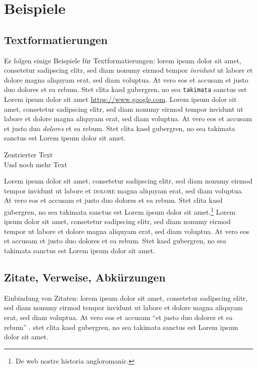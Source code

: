 \chapter{Beispiele}\label{ch:beispiele}
\lipsum[1]

\section{Textformatierungen}\label{sec:textformatierungen}

Es folgen einige Beispiele für Textformatierungen: lorem ipsum dolor sit amet, consetetur sadipscing elitr, sed diam nonumy eirmod tempor \emph{invidunt} ut labore et dolore magna aliquyam erat, sed diam voluptua. At vero eos et accusam et justo duo dolores et ea rebum. Stet clita kasd gubergren, no sea \texttt{takimata} sanctus est Lorem ipsum dolor sit amet \url{https://www.google.com}. Lorem ipsum dolor sit amet, consetetur sadipscing elitr, sed diam nonumy eirmod tempor invidunt ut labore et dolore magna aliquyam erat, sed diam voluptua. At vero eos et accusam et justo duo \textit{dolores} et ea rebum. Stet clita kasd gubergren, no sea takimata sanctus est Lorem ipsum dolor sit amet.

\begin{center}
Zentrierter Text \\
Und noch mehr Text \\
\end{center}

Lorem ipsum dolor sit amet, consetetur sadipscing elitr, sed diam nonumy eirmod tempor invidunt ut labore et \textsc{dolore} magna aliquyam erat, sed diam voluptua. At vero eos et accusam et justo duo dolores et ea rebum. Stet clita kasd gubergren, no sea takimata sanctus est Lorem ipsum dolor sit amet.\footnote{De web nostre historia angloromanic.} Lorem ipsum dolor sit amet, consetetur sadipscing elitr, sed diam nonumy eirmod tempor  ut labore et dolore magna aliquyam erat, sed diam voluptua. At vero eos et accusam et justo duo dolores et ea rebum. Stet  kasd gubergren, no sea takimata sanctus est Lorem ipsum dolor sit amet.

\section{Zitate, Verweise, Abkürzungen}

Einbindung von Zitaten: lorem ipsum dolor sit amet, consetetur sadipscing elitr, sed diam nonumy eirmod tempor invidunt ut labore et dolore magna aliquyam erat, sed diam voluptua. At vero eos et accusam ``et justo duo dolores et ea rebum'' \citep{cormen:2001}. \citeauthor{taleb:2012} \citep{taleb:2012} stet clita kasd gubergren, no sea takimata sanctus est Lorem ipsum dolor sit amet.

